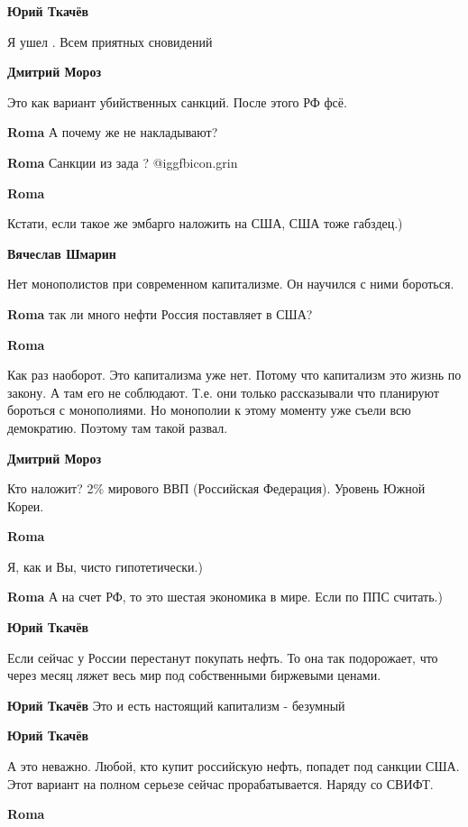 \begin{itemize}
\textbf{Юрий Ткачёв}

Я ушел . Всем приятных сновидений

\textbf{Дмитрий Мороз}

Это как вариант убийственных санкций. После этого РФ фсё.

\textbf{Roma}
А почему же не накладывают?

\textbf{Roma}
Санкции из зада  ?  @igg{fbicon.grin} 

\textbf{Roma}

Кстати, если такое же эмбарго наложить на США, США тоже габздец.)

\textbf{Вячеслав Шмарин}

Нет монополистов при современном капитализме. Он научился с ними бороться.

\textbf{Roma}
так ли много нефти Россия поставляет в США?

\textbf{Roma}

Как раз наоборот. Это капитализма уже нет. Потому что капитализм это жизнь по
закону. А там его не соблюдают. Т.е. они только рассказывали что планируют
бороться с монополиями. Но монополии к этому моменту уже съели всю демократию.
Поэтому там такой развал.

\textbf{Дмитрий Мороз}

Кто наложит? 2\% мирового ВВП (Российская Федерация). Уровень Южной Кореи.

\textbf{Roma}

Я, как и Вы, чисто гипотетически.)

\textbf{Roma}
А на счет РФ, то это шестая экономика в мире. Если по ППС считать.)

\textbf{Юрий Ткачёв}

Если сейчас у России перестанут покупать нефть. То она так подорожает, что
через месяц ляжет весь мир под собственными биржевыми ценами.

\textbf{Юрий Ткачёв}
Это и есть настоящий капитализм - безумный

\textbf{Юрий Ткачёв}

А это неважно. Любой, кто купит российскую нефть, попадет под санкции США. Этот
вариант на полном серьезе сейчас прорабатывается. Наряду со СВИФТ.

\textbf{Roma}


\end{itemize}
